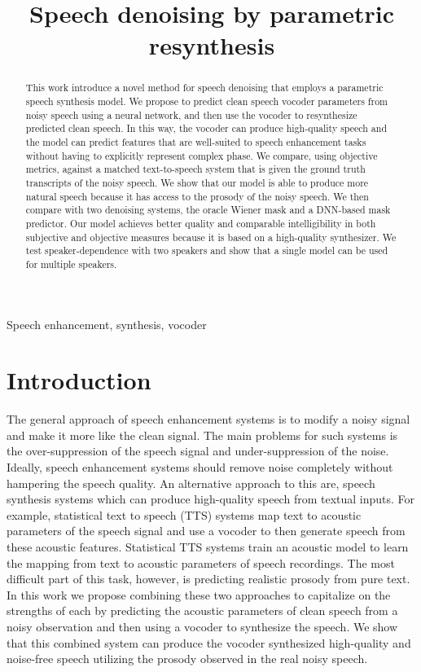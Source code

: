 \documentclass{article}
\title{Speech denoising by parametric resynthesis}
\begin{document}
%
\maketitle
%
\begin{abstract}

This work introduce a novel method for speech denoising that employs a parametric speech synthesis model. We propose to predict clean speech vocoder parameters from noisy speech using a neural network, and then use the vocoder to resynthesize predicted clean speech. In this way, the vocoder can produce high-quality speech and the model can predict features that are well-suited to speech enhancement tasks without having to explicitly represent complex phase. We compare, using objective metrics, against a matched text-to-speech system that is given the ground truth transcripts of the noisy speech. We show that our model is able to produce more natural speech because it has access to the prosody of the noisy speech. We then compare with two denoising systems, the oracle Wiener mask and a DNN-based mask predictor. Our model achieves better quality and comparable intelligibility in both subjective and objective measures because it is based on a high-quality synthesizer. We test speaker-dependence with two speakers and show that a single model can be used for multiple speakers.  
\end{abstract}
%
\begin{keywords}
Speech enhancement, synthesis, vocoder
\end{keywords}
%

\section{Introduction}
\label{sec:intro}
The general approach of speech enhancement systems is to modify a noisy signal and make it more like the clean signal. The main problems for such systems is the over-suppression of the speech signal and under-suppression of the noise. Ideally, speech enhancement systems should remove noise completely without hampering the speech quality. An alternative approach to this are, speech synthesis systems which can produce high-quality speech from textual inputs. For example, statistical text to speech (TTS) systems map text to acoustic parameters of the speech signal and use a vocoder to then generate speech from these acoustic features. Statistical TTS systems train an acoustic model to learn the mapping from text to acoustic parameters of speech recordings. The most difficult part of this task, however, is predicting realistic prosody from pure text. In this work we propose combining these two approaches to capitalize on the strengths of each by predicting the acoustic parameters of clean speech from a noisy observation and then using a vocoder to synthesize the speech.  We show that this combined system can produce the vocoder synthesized high-quality and noise-free speech utilizing the prosody observed in the real noisy speech. 
\end{document}
